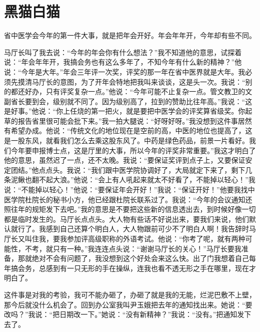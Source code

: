 \documentclass[12pt,oneside]{book}
\begin{document}
\chapter{黑猫白猫}

省中医学会今年的第一件大事，就是把年会开好。年会年年开，今年却有些不同。

马厅长叫了我去说：``今年的年会你有什么想法？''我不知道他的意思，试探着说：``年会年年开，我搞会务也有这么多年了，不知今年有什么新的精神？''他说：``今年是大年。''年会三年评一次奖，评奖的那一年在省中医界就是大年。我必须先摸清马厅长的意图，为了开年会特地把我叫来谈谈，这是头一次。我说：``别的都还好办，只有评奖复杂一点。''他说：``今年可能不止复杂一点。管文教卫的文副省长要到会，级别就不同了。因为级别高了，拉到的赞助比往年高。''我说：``这是好事。''他说：``你上任烧的第一把火，就是要把中医学会的评奖算省级奖。你起草的报告省里很可能会批下来。''我一拍大腿说：``好呀好呀。''我没想到这件事居然有希望办成。他说：``传统文化的地位现在是空前的高，中医的地位也提高了，这是一股东风，就看我们怎么去乘这股东风了。中药是绿色药品，前景一片看好。我们今年要申报博士点，这是厅里的大事，所以今年的评奖非常重要。''我这才明白了他的意思，虽然迟了一点，还不太晚。我说：``要保证奖评到点子上，又要保证安定团结。''他点点头。我说：``我们跟中医学院协调好了，大局就定下来了，剩下几条泥鳅也翻不起大浪。''他说：``会上有人吼起来就太不好看了，不能掉以轻心！''我说：``不能掉以轻心！''他说：``要保证年会开好！''我说：``保证开好！''他要我找中医学院杜院长的秘书小方，他已经跟杜院长联系过了。我说：``今年的会议通知还照往年的规矩发下去吧。''我的意思是不要把这些新的信息透出去，到时候好像一切都是临时发生的。马厅长点点头。大人物有些话不好说出来，要我们来说，他们默认就行了。我感到自己还算个明白人，大人物跟前可少不了明白人啊！我告辞时马厅长又叫住我，要我参加评高级职称的外语考试。他说：``你考了呢，就有两种可能性，不考，就只有一种。''我连连点头说：``谢谢马厅长的关心！''马厅长要我准备，那就绝对不会有问题了，我没想到这个好处会来这么快。出了门我想着自己每年搞会务，总感到有一只无形的手在操纵，连我也看不透无形之手在哪里，现在才明白了。

这件事是对我的考验，我可不能办砸了，办砸了就是我的无能，烂泥巴敷不上壁，那今后就没什么机会了。回到办公室我叫尹玉娥把去年的通知找出来。她说：``要改吗？''我说：``把日期改一下。''她说：``没有新精神？''我说：``没有。''把通知发下去了。
\end{document}
